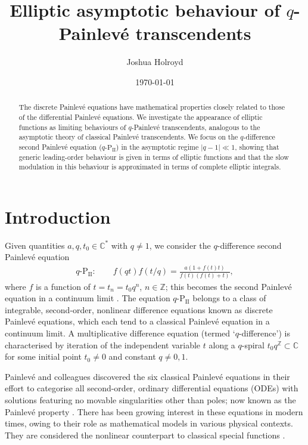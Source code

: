 \documentclass[reqno,a4paper]{amsart}
\title[Elliptic Asymptotic Behaviour of $q$-$\Ptwo$]{Elliptic asymptotic behaviour of $q$-Painlev\'e transcendents}
\author{Joshua Holroyd}
\date{\today}
\numberwithin{equation}{section}
\theoremstyle{plain}
\theoremstyle{remark}
\newcommand\Ptwo{\textrm{P}_{\textrm{II}}}
\begin{document}
\begin{abstract}
    The discrete Painlev\'e equations have mathematical properties closely related to those of the differential Painlev\'e equations. We investigate the appearance of elliptic functions as limiting behaviours of $q$-Painlev\'e transcendents, analogous to the asymptotic theory of classical Painlev\'e transcendents. We focus on the $q$-difference second Painlev\'e equation ($q$-$\Ptwo$) in the asymptotic regime $|q-1|\ll1$, showing that generic leading-order behaviour is given in terms of elliptic functions and that the slow modulation in this behaviour is approximated in terms of complete elliptic integrals.
\end{abstract}
\maketitle

\section{Introduction} Given quantities $a,q,t_0\in\mathbb{C}^*$ with $q\neq1$,  we consider the $q$-difference second Painlev\'e equation \cite{ramani1996discrete}
\begin{align*}
    q\text{-}\Ptwo:\qquad f(qt)f(t/q)=\frac{a(1+f(t)t)}{f(t)(f(t)+t)},
\end{align*}
where $f$ is a function of $t=t_n=t_0q^{n}$, $n\in\mathbb{Z}$; this becomes the second Painlev\'e equation in a continuum limit \cite{ramani1996discrete}. The equation $q$-$\Ptwo$ belongs to a class of integrable, second-order, nonlinear difference equations known as discrete Painlev\'e equations, which each tend to a classical Painlev\'e equation in a continuum limit. A multiplicative difference equation (termed `$q$-difference') is characterised by iteration of the independent variable $t$ along a $q$-spiral $t_0q^{\mathbb{Z}}\subset\mathbb{C}$ for some initial point $t_0\neq0$ and constant $q\neq 0,1$.

Painlev\'e and colleagues discovered the six classical Painlev\'e equations in their effort to categorise all second-order, ordinary differential equations (ODEs) with solutions featuring no movable singularities other than poles; now known as the Painlev\'e property \cite{painleve1902equations,fuchs1905quelque,gambier1910equations}. There has been growing interest in these equations in modern times, owing to their role as mathematical models in various physical contexts. They are considered the nonlinear counterpart to classical special functions \cite{bornemann2010request}.
\end{document}
